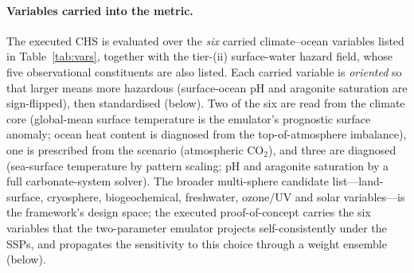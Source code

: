 \documentclass[10pt]{article}
\begin{document}
\paragraph*{Variables carried into the metric.}
The executed CHS is evaluated over the \emph{six} carried climate--ocean variables
listed in Table~\ref{tab:vars}, together with the tier-(ii) surface-water hazard
field, whose five observational constituents are also listed. Each carried
variable is \emph{oriented} so that larger means more hazardous (surface-ocean pH
and aragonite saturation are sign-flipped), then standardised (below). Two of the
six are read from the climate core (global-mean surface temperature is the
emulator's prognostic surface anomaly; ocean heat content is diagnosed from the
top-of-atmosphere imbalance), one is prescribed from the scenario (atmospheric
CO$_2$), and three are diagnosed (sea-surface temperature by pattern scaling; pH
and aragonite saturation by a full carbonate-system solver). The broader
multi-sphere candidate list---land-surface, cryosphere, biogeochemical,
freshwater, ozone/UV and solar variables---is the framework's design space; the
executed proof-of-concept carries the six variables that the two-parameter
emulator projects self-consistently under the SSPs, and propagates the
sensitivity to this choice through a weight ensemble (below).
\end{document}
